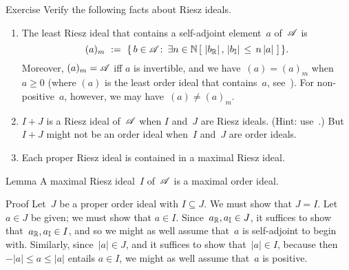 \documentclass[main]{subfiles}
\begin{document}
\begin{parsec}
\begin{point}{Exercise}
Verify the following facts about Riesz ideals.
\begin{enumerate}
\item
The least Riesz ideal that contains a self-adjoint element~$a$
of~$\mathscr{A}$ is
\begin{equation*}
(a)_m\ :=\ \{\,b\in \mathscr{A}\colon\, 
\exists n\in \mathbb{N}\,[\ \left|b_{\mathbb{R}}\right|,\,\left|b_{\mathbb{I}}\right|
\,\leq\, n\left|a\right| \ ]\,\}.
\end{equation*}
Moreover,  $(a)_m=\mathscr{A}$ iff $a$ is invertible,
and we have~$(a)=(a)_m$ when~$a\geq 0$
(where $(a)$ is the least order ideal that contains~$a$,
see~).
For non-positive~$a$, however, we may have~$(a)\neq (a)_m$.
\item
$I+J$ is a Riesz ideal of~$\mathscr{A}$
when $I$ and~$J$ are Riesz ideals. (Hint: use~.)
But~$I+J$ might not be an order ideal
when~$I$ and~$J$ are order ideals.

\item
Each proper Riesz ideal is contained in a maximal Riesz ideal.
\end{enumerate}
\end{point}
\begin{point}{Lemma}%
A maximal Riesz ideal~$I$ of~$\mathscr{A}$
is a maximal order ideal.
\begin{point}{Proof}%
Let~$J$ be a proper order ideal with $I\subseteq J$.
We must show that $J=I$.
Let~$a\in J$ be given;
we must show that $a\in I$.
Since~$a_{\mathbb{R}},a_{\mathbb{I}}\in J$,
it suffices to show that~$a_{\mathbb{R}},a_{\mathbb{I}}\in I$,
and so we might as well assume that~$a$ is self-adjoint
to begin with.
Similarly,
since~$\left|a\right|\in J$,
and it suffices to show that~$\left|a\right|\in I$,
because then $-\left|a\right|\leq a\leq \left|a\right|$
entails $a\in I$,
we might as well assume that~$a$ is positive.


\end{point}
\end{point}
\end{parsec}
\end{document}

